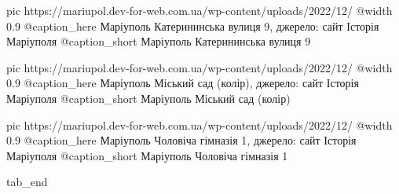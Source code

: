   pic https://mariupol.dev-for-web.com.ua/wp-content/uploads/2022/12/%
  @width 0.9
  @caption_here Маріуполь Катерининська вулиця 9, джерело: сайт Історія Маріуполя
  @caption_short Маріуполь Катерининська вулиця 9

  pic https://mariupol.dev-for-web.com.ua/wp-content/uploads/2022/12/%
  @width 0.9
  @caption_here Маріуполь Міський сад (колір), джерело: сайт Історія Маріуполя
  @caption_short Маріуполь Міський сад (колір)

  pic https://mariupol.dev-for-web.com.ua/wp-content/uploads/2022/12/%
  @width 0.9
  @caption_here Маріуполь Чоловіча гімназія 1, джерело: сайт Історія Маріуполя
  @caption_short Маріуполь Чоловіча гімназія 1




  tab_end
\fi
